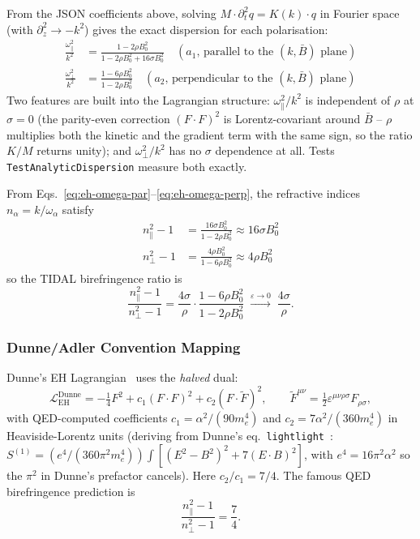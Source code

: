 From the JSON coefficients above, solving $M \cdot \partial_t^2 q = K(k)\cdot q$ in Fourier space (with $\partial_z^2 \to -k^2$) gives the exact dispersion for each polarisation:
\begin{align}
  \frac{\omega_{\parallel}^2}{k^2} &= \frac{1 - 2\rho B_0^2}{1 - 2\rho B_0^2 + 16\sigma B_0^2}
  \quad(a_1\text{, parallel to the }(k,\bar{B})\text{ plane}) \label{eq:eh-omega-par}\\
  \frac{\omega_{\perp}^2}{k^2} &= \frac{1 - 6\rho B_0^2}{1 - 2\rho B_0^2}
  \quad(a_2\text{, perpendicular to the }(k,\bar{B})\text{ plane}) \label{eq:eh-omega-perp}
\end{align}
Two features are built into the Lagrangian structure: $\omega_\parallel^2/k^2$ is independent of $\rho$ at $\sigma=0$ (the parity-even correction $(F\cdot F)^2$ is Lorentz-covariant around $\bar{B}$ -- $\rho$ multiplies both the kinetic and the gradient term with the same sign, so the ratio $K/M$ returns unity); and $\omega_\perp^2/k^2$ has no $\sigma$ dependence at all. Tests \texttt{TestAnalyticDispersion} measure both exactly.

From Eqs.~\eqref{eq:eh-omega-par}--\eqref{eq:eh-omega-perp}, the refractive indices $n_\alpha = k/\omega_\alpha$ satisfy
\begin{align}
  n_\parallel^2 - 1 &= \frac{16\sigma B_0^2}{1 - 2\rho B_0^2} \approx 16\sigma B_0^2 \\
  n_\perp^2 - 1 &= \frac{4\rho B_0^2}{1 - 6\rho B_0^2} \approx 4\rho B_0^2
\end{align}
so the TIDAL birefringence ratio is
\begin{equation}
  \frac{n_\parallel^2 - 1}{n_\perp^2 - 1}
  = \frac{4\sigma}{\rho} \cdot \frac{1 - 6\rho B_0^2}{1 - 2\rho B_0^2}
  \;\xrightarrow{\varepsilon \to 0}\; \frac{4\sigma}{\rho}.
  \label{eq:eh-tidal-ratio}
\end{equation}

\subsubsection{Dunne/Adler Convention Mapping}
\label{sec:pr-eh-dunne-mapping}

Dunne's EH Lagrangian~\cite{Dunne2004} uses the \emph{halved} dual:
\begin{equation}
  \mathcal{L}_{\mathrm{EH}}^{\mathrm{Dunne}}
  = -\tfrac14 F^2 + c_1 (F\cdot F)^2 + c_2 (F\cdot \tilde{F})^2,
  \qquad
  \tilde{F}^{\mu\nu} = \tfrac12 \varepsilon^{\mu\nu\rho\sigma} F_{\rho\sigma},
  \label{eq:eh-dunne-lagrangian}
\end{equation}
with QED-computed coefficients $c_1 = \alpha^2/(90 m_e^4)$ and $c_2 = 7\alpha^2/(360 m_e^4)$ in Heaviside-Lorentz units (deriving from Dunne's eq.~\texttt{lightlight}~\cite{Dunne2004}: $S^{(1)} = (e^4/(360\pi^2 m_e^4))\int[(E^2-B^2)^2 + 7(E\cdot B)^2]$, with $e^4 = 16\pi^2\alpha^2$ so the $\pi^2$ in Dunne's prefactor cancels). Here $c_2/c_1 = 7/4$. The famous QED birefringence prediction is~\cite{Adler1971}
\begin{equation}
  \frac{n_\parallel^2 - 1}{n_\perp^2 - 1} = \frac{7}{4}.
  \label{eq:eh-qed-ratio}
\end{equation}

